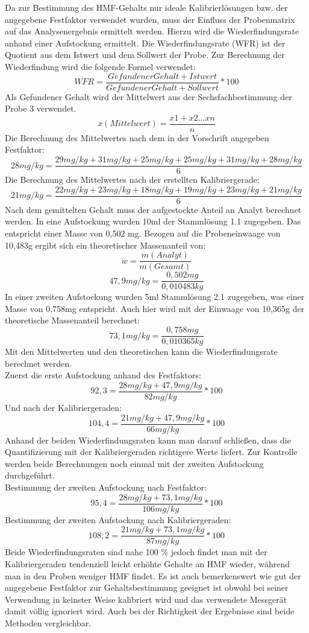 Da zur Bestimmung des HMF-Gehalts nur ideale Kalibrierlösungen bzw. der angegebene Festfaktor verwendet wurden, muss der Einfluss der Probenmatrix auf das Analysenergebnis ermittelt werden. Hierzu wird die Wiederfindungsrate anhand einer Aufstockung ermittelt. Die Wiederfindungsrate (WFR) ist der Quotient aus dem Istwert und dem Sollwert der Probe. Zur Berechnung der Wiederfindung wird die folgende Formel verwendet:
	\[WFR=\frac{ Gefundener Gehalt + Istwert }{ Gefundener Gehalt + Sollwert } *100 \]
Als Gefundener Gehalt wird der Mittelwert aus der Sechsfachbestimmung der Probe 3 verwendet.
	\[x(Mittelwert)=\frac{ x1+x2...xn }{ n } \]
Die Berechnung des Mittelwertes nach dem in der Vorschrift angegeben  Festfaktor:
	\[28mg/kg=\frac{ 29mg/kg+31mg/kg+25mg/kg+25mg/kg+31mg/kg+28mg/kg }{ 6 } \]
Die Berechnung des Mittelwertes nach der erstellten Kalibriergerade:
	\[21mg/kg=\frac{ 22mg/kg+23mg/kg+18mg/kg+19mg/kg+23mg/kg+21mg/kg }{ 6 } \]
Nach dem gemittelten Gehalt muss der aufgestockte Anteil an Analyt berechnet werden. In eine Aufstockung wurden 10ml der Stammlösung 1.1 zugegeben. Das entspricht einer Masse von 0,502 mg. Bezogen auf die Probeneinwaage von 10,483g ergibt sich ein theoretischer Massenanteil von:  
	\[w=\frac{ m(Analyt) }{ m(Gesamt) } \]
	\[47,9mg/kg=\frac{ 0,502mg }{ 0,010483kg } \]
In einer zweiten Aufstockung wurden 5ml Stammlösung 2.1 zugegeben, was einer Masse von 0,758mg entspricht. Auch hier wird mit der Einwaage von 10,365g der theoretische Massenanteil berechnet:
	\[73,1mg/kg=\frac{ 0,758mg }{ 0,010365kg } \]
Mit den Mittelwerten und den theoretischen kann die Wiederfindungsrate berechnet werden.\\
Zuerst die erste Aufstockung anhand des Festfaktors:
	\[92,3=\frac{ 28mg/kg + 47,9mg/kg }{ 82mg/kg } *100 \]
Und nach der Kalibriergeraden:
	\[104,4=\frac{ 21mg/kg + 47,9mg/kg }{ 66mg/kg } *100 \]
Anhand der beiden Wiederfindungsraten kann man darauf schließen, dass die Quantifizierung mit der Kalibriergeraden richtigere Werte liefert. Zur Kontrolle werden beide Berechnungen noch einmal mit der zweiten Aufstockung durchgeführt.\\
Bestimmung der zweiten Aufstockung nach Festfaktor:
	\[95,4=\frac{ 28mg/kg + 73,1mg/kg }{ 106mg/kg } *100 \]
Bestimmung der zweiten Aufstockung nach Kalibriergeraden:
	\[108,2=\frac{ 21mg/kg + 73,1mg/kg }{ 87mg/kg } *100 \]
Beide Wiederfindungsraten sind nahe 100 \% jedoch findet man mit der Kalibriergeraden tendenziell leicht erhöhte Gehalte an HMF wieder, während man in den Proben weniger HMF findet. Es ist auch bemerkenswert wie gut der angegebene Festfaktor zur Gehaltsbestimmung geeignet ist obwohl bei seiner Verwendung in keinster Weise kalibriert wird und das verwendete Messgerät damit völlig ignoriert wird. Auch bei der Richtigkeit der Ergebnisse sind beide Methoden vergleichbar.

